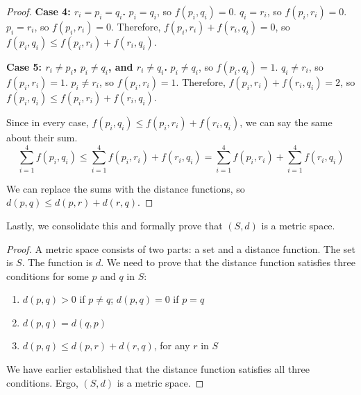 \documentclass[11pt]{article}
\begin{document}
\begin{proof}
            \textbf{Case 4: $r_i = p_i = q_i$.}
            $p_i = q_i$, so $f(p_i,q_i) = 0$.
            $q_i = r_i$, so $f(p_i,r_i) = 0$.
            $p_i = r_i$, so $f(p_i,r_i) = 0$.
            Therefore,  $f(p_i, r_i) + f(r_i, q_i) = 0$, so $f(p_i,q_i) \leq f(p_i, r_i) + f(r_i, q_i)$.

            \textbf{Case 5: $r_i \neq p_i$, $p_i \neq q_i$, and $r_i \neq q_i$.}
            $p_i \neq q_i$, so $f(p_i,q_i) = 1$.
            $q_i \neq r_i$, so $f(p_i,r_i) = 1$.
            $p_i \neq r_i$, so $f(p_i,r_i) = 1$.
            Therefore,  $f(p_i, r_i) + f(r_i, q_i) = 2$, so $f(p_i,q_i) \leq f(p_i, r_i) + f(r_i, q_i)$.

            Since in every case, $f(p_i,q_i) \leq f(p_i, r_i) + f(r_i, q_i)$, we can say the same about their sum.
            \begin{equation}
                \sum_{i = 1}^{4} f(p_i,q_i) \leq \sum_{i = 1}^{4} f(p_i, r_i) + f(r_i, q_i)
                    =   \sum_{i = 1}^{4} f(p_i, r_i) + \sum_{i = 1}^{4} f(r_i, q_i)
            \end{equation}

            We can replace the sums with the distance functions, so $d(p,q) \leq d(p,r) + d(r,q)$.
        \end{proof}

        Lastly, we consolidate this and formally prove that $(S,d)$ is a metric space.
        \begin{proof}
            A metric space consists of two parts: a set and a distance function.
            The set is $S$.
            The function is $d$.
            We need to prove that the distance function satisfies three conditions for some $p$ and $q$ in $S$:
            \begin{enumerate}[label=(\alph*)]
                \item   $d(p,q) > 0$ if $p \neq q$; $d(p,q) = 0$ if $p = q$
                \item   $d(p,q) = d(q,p)$
                \item   $d(p,q) \leq d(p,r) + d(r,q)$, for any $r$ in $S$
            \end{enumerate}

            We have earlier established that the distance function satisfies all three conditions.
            Ergo, $(S,d)$ is a metric space.
        \end{proof}
\end{document}

